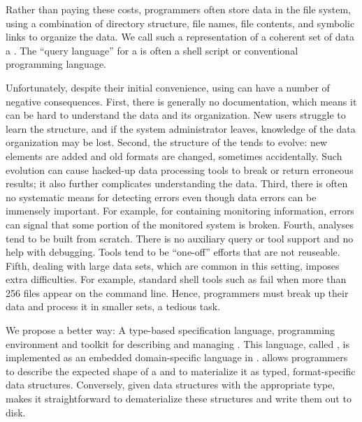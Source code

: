 Rather than paying these costs, programmers often store data in
the file system, using a combination of directory structure, file
names, file contents, and symbolic links to organize the data.  We call such a
representation of a coherent set of data a \textit{\filestore{}}.
The ``query language'' for a \filestore{}
is often a shell script or conventional programming language.

Unfortunately, despite their initial convenience,
using \filestores{} can have a number of 
negative consequences.  First, there is generally no documentation,
which means it can be hard to understand the data and its
organization.  New users struggle to learn the structure, and if
the system administrator leaves, knowledge of the data
organization may be lost.  Second, the structure of the \filestore{} tends
to evolve: new elements are added and old formats are changed, sometimes
accidentally.  Such evolution can cause hacked-up data processing
tools to break or return erroneous results; it also further complicates
understanding the data.  Third, there is often no
systematic means for detecting errors even though data errors can
be immensely
important.  For example, for \filestores{} containing monitoring information,
errors can signal that some portion of the monitored system is broken.
Fourth, analyses tend to be built from scratch.
There is no auxiliary query or tool support and no help with debugging.
Tools tend to be ``one-off'' efforts that are not
reuseable.  Fifth, dealing with
large data sets, which are common in this setting, imposes extra
difficulties.  For example,  standard shell tools
such as  fail when more than 256 files appear on the
command line.  Hence, programmers must  break up their data
and process it in smaller sets, a tedious task.

We propose a better way: A type-based
specification language, programming environment and toolkit for
describing and managing \filestores{}.  
This language, called \forest{}, is implemented as an embedded domain-specific
language in \haskell{}.
\forest{} allows programmers to describe the expected shape of a
\filestore{} and to materialize it as typed,
format-specific \haskell{} data structures.  Conversely,
given data structures with the appropriate type, \forest{}
makes it straightforward to dematerialize these structures
and write them out to disk.  

